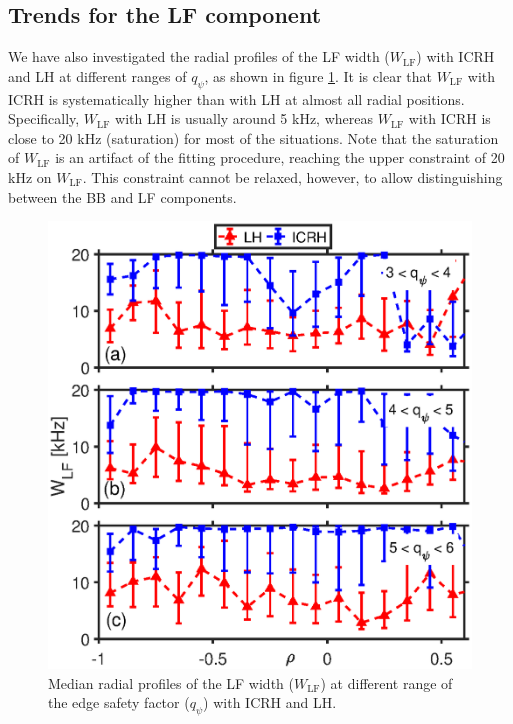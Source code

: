 

\subsection{Trends for the LF component}

We have also investigated the radial profiles of the LF width ($W_\mathrm{LF}$) with ICRH and LH at different ranges of $q_{\psi}$, as shown in figure \ref{fig:WLF_r_Lmode}. It is clear that $W_\mathrm{LF}$ with ICRH is systematically higher than with LH at almost all radial positions. Specifically, $W_\mathrm{LF}$ with LH is usually around 5 kHz, whereas $W_\mathrm{LF}$ with ICRH is close to 20 kHz (saturation) for most of the situations. Note that the saturation of $W_\mathrm{LF}$ is an artifact of the fitting procedure, reaching the upper constraint of 20 kHz on $W_\mathrm{LF}$. This constraint cannot be relaxed, however, to allow distinguishing between the BB and LF components.


\begin{figure}[h]
\begin{centering}
\includegraphics[scale=0.6]{fig_WLF_ICRH_LH.eps}
\par\end{centering}
\caption{Median radial profiles of the LF width ($W_\mathrm{LF}$) at different range of the edge safety factor ($q_{\psi}$) with ICRH and LH.}
\label{fig:WLF_r_Lmode}
\end{figure}



